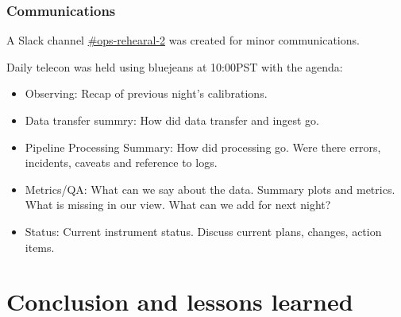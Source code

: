 \subsubsection{Communications }


A Slack channel \href{https://lsstc.slack.com/messages/CJBSY6FUN}{\#ops-rehearal-2} was created for minor communications.

Daily telecon was held using bluejeans at 10:00PST with the agenda:
\begin{itemize}
\item Observing: Recap of previous night's calibrations.
\item Data transfer summry:  How did data transfer and ingest go.
\item Pipeline Processing Summary: 	How did processing go.  Were there errors, incidents, caveats and reference to logs.
\item Metrics/QA:  What can we say about the data. Summary plots and metrics.  What is missing in our view. What can we add for next night?
\item Status:   Current instrument status.  Discuss current plans, changes, action items.

\end{itemize}







\section{Conclusion and lessons learned}\label{sec:conc}





